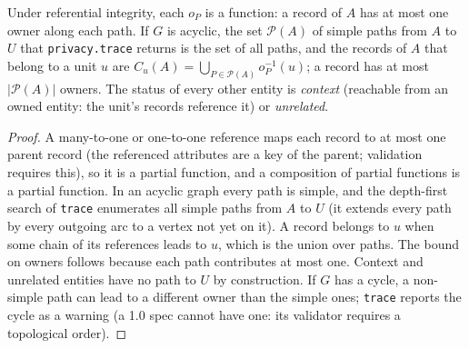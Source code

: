\begin{proposition}\label{prop:irowner}
Under referential integrity, each $o_P$ is a function: a record of $A$ has at most one owner along each path. If $G$
is acyclic, the set $\mathcal P(A)$ of simple paths from $A$ to $U$ that \texttt{privacy.trace} returns is the set of
all paths, and the records of $A$ that belong to a unit $u$ are $C_u(A)=\bigcup_{P\in\mathcal P(A)}o_P^{-1}(u)$; a
record has at most $|\mathcal P(A)|$ owners. The status of every other entity is \emph{context} (reachable from an
owned entity: the unit's records reference it) or \emph{unrelated}.
\end{proposition}
\begin{proof}
A many-to-one or one-to-one reference maps each record to at most one parent record (the referenced attributes are a
key of the parent; validation requires this), so it is a partial function, and a composition of partial functions is
a partial function. In an acyclic graph every path is simple, and the depth-first search of \texttt{trace} enumerates
all simple paths from $A$ to $U$ (it extends every path by every outgoing arc to a vertex not yet on it). A record
belongs to $u$ when some chain of its references leads to $u$, which is the union over paths. The bound on owners
follows because each path contributes at most one. Context and unrelated entities have no path to $U$ by
construction. If $G$ has a cycle, a non-simple path can lead to a different owner than the simple ones; \texttt{trace}
reports the cycle as a warning (a 1.0 spec cannot have one: its validator requires a topological order).
\end{proof}

